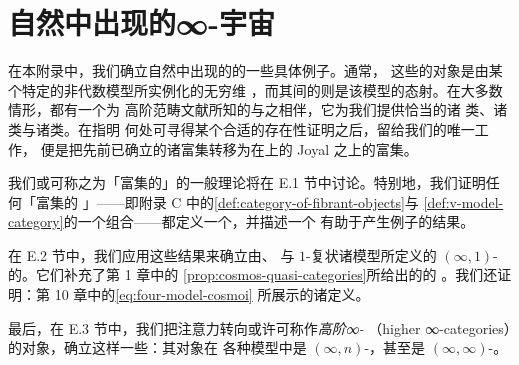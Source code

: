 \chapter{自然中出现的∞-宇宙}\label{ch:cosmoi-found-in-nature}


在本附录中，我们确立自然中出现的\trInfinityCosmos{}的一些具体例子。通常，
这些\trInfinityCosmos{}的对象是由某个特定的非代数模型所实例化的无穷维%
\trCategory，而其间的\trFunctor{}则是该模型的态射。在大多数情形，都有一个为%
高阶范畴文献所知的\trModelStructure{}与之相伴，它为我们提供恰当的诸%
\trIsofibration{}类、诸\trEquivalence{}类与诸\trTrivialFibration{}类。在指明%
何处可寻得某个合适\trModelStructure{}的存在性证明之后，留给我们的唯一工作，%
便是把先前已确立的诸富集转移为在\trSimplicialSet{}上\trQuasiCategory{}的%
Joyal \trModelStructure{}之上的富集。

我们或可称之为「\trQuasiCategory{}富集的\trModelCategory」的一般理论将在%
E.1 节中讨论。特别地，我们证明任何「\trQuasiCategory{}富集的%
\trCategoryOfFibrantObjects」——即附录 C 中的\cref{def:category-of-fibrant-objects}与%
\cref{def:v-model-category}的一个组合——都定义一个\trInfinityCosmos，并描述一个%
有助于产生例子的\trChangeOfBase{}结果。

在 E.2 节中，我们应用这些结果来确立由\trCompleteSegalSpaces、%
\trSegalCategories{}与 $1$-复状\trSimplicialSet{}诸模型所定义的%
$(\infty,1)$-\trCategory{}的\trInfinityCosmos。它们补充了第 1 章中的%
\cref{prop:cosmos-quasi-categories}所给出的\trQuasiCategory{}的%
\trInfinityCosmos。我们还证明：第 10 章中的\eqref{eq:four-model-cosmoi}%
所展示的诸\trChangeOfModel{}\trFunctor{}定义\trCosmologicalBiequivalence。

最后，在 E.3 节中，我们把注意力转向或许可称作\emph{高阶∞-\trCategory}%
（higher ∞-categories）的对象，确立这样一些\trInfinityCosmos：其对象在%
各种模型中是 $(\infty,n)$-\trCategory，甚至是 $(\infty,\infty)$-\trCategory。

